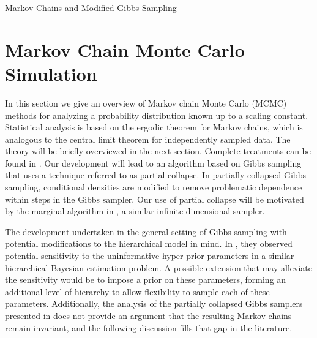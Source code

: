 \begin{chapter}{Markov Chains and Modified Gibbs Sampling}
\section{Markov Chain Monte Carlo Simulation} \label{sec:mcmcTheory}
In this section we give an overview of Markov chain Monte Carlo (MCMC) methods for analyzing a probability distribution known up to a scaling constant.
Statistical analysis is based on the ergodic theorem for Markov chains, which is analogous to the central limit theorem for independently sampled data. 
The theory will be briefly overviewed in the next section. 
Complete treatments can be found in \citep{robert2013monte}.
Our development will lead to an algorithm based on Gibbs sampling that uses a technique referred to as partial collapse.  
In partially collapsed Gibbs sampling, conditional densities are modified to remove problematic dependence within steps in the Gibbs sampler.
Our use of partial collapse will be motivated by the marginal algorithm in \citep{agapiou2014analysis}, a similar infinite dimensional sampler.

The development undertaken in the general setting of Gibbs sampling with potential modifications to the hierarchical model in mind.
In \citep{howard2016bayesian}, they observed potential sensitivity to the uninformative hyper-prior parameters in a similar hierarchical Bayesian estimation problem.
A possible extension that may alleviate the sensitivity would be to impose a prior on these parameters, forming an additional level of hierarchy to allow flexibility to sample each of these parameters.
Additionally, the analysis of the partially collapsed Gibbs samplers presented in \citep{van2015metropolis,van2008partially} does not provide an argument that the resulting Markov chains remain invariant, and the following discussion fills that gap in the literature.


\end{chapter}
